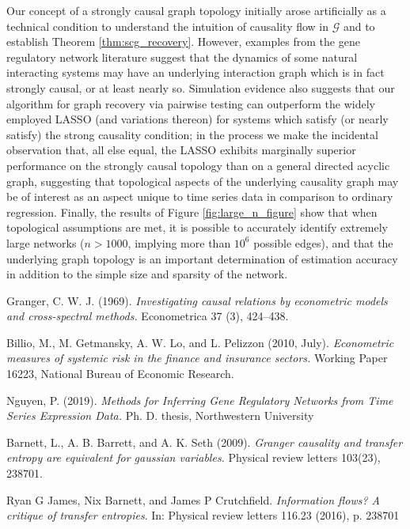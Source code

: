 \documentclass[12pt]{article}
\def\gcg{\mathcal{G}}  %
\begin{document}
Our concept of a strongly causal graph topology initially arose
artificially as a technical condition to understand the intuition of
causality flow in $\gcg$ and to establish Theorem
\ref{thm:scg_recovery}.  However, examples from the gene regulatory
network literature suggest that the dynamics of some natural
interacting systems may have an underlying interaction graph which is
in fact strongly causal, or at least nearly so.  Simulation evidence
also suggests that our algorithm for graph recovery via pairwise
testing can outperform the widely employed LASSO (and variations
thereon) for systems which satisfy (or nearly satisfy) the strong
causality condition; in the process we make the incidental observation
that, all else equal, the LASSO exhibits marginally superior
performance on the strongly causal topology than on a general directed
acyclic graph, suggesting that topological aspects of the underlying
causality graph may be of interest as an aspect unique to time series
data in comparison to ordinary regression.  Finally, the results of
Figure \ref{fig:large_n_figure} show that when topological assumptions
are met, it is possible to accurately identify extremely large
networks ($n > 1000$, implying more than $10^6$ possible edges), and
that the underlying graph topology is an important determination of
estimation accuracy in addition to the simple size and sparsity of the
network.
 

\begin{thebibliography}{00}
\setlength{\itemsep}{-1mm}
\small
{} Granger,
  C. W. J. (1969). \textit{Investigating causal relations by
    econometric models and cross-spectral methods.} Econometrica 37
  (3), 424–438.

 Billio, M., M. Getmansky, A. W. Lo, and
  L. Pelizzon (2010, July). \textit{Econometric measures of systemic
    risk in the finance and insurance sectors.}  Working Paper 16223,
  National Bureau of Economic Research.

  Nguyen, P. (2019). \textit{Methods for Inferring Gene Regulatory
    Networks from Time Series Expression Data.}
  Ph. D. thesis, Northwestern University

 Barnett, L., A. B. Barrett, and
  A. K. Seth (2009). \textit{Granger causality and transfer entropy
    are equivalent for gaussian variables.} Physical review letters
  103(23), 238701.
  
 Ryan G James, Nix Barnett, and
  James P Crutchfield. \textit{Information flows? A critique of
    transfer entropies}. In: Physical review letters 116.23 (2016),
  p. 238701
\end{thebibliography}
\normalsize
\end{document}
